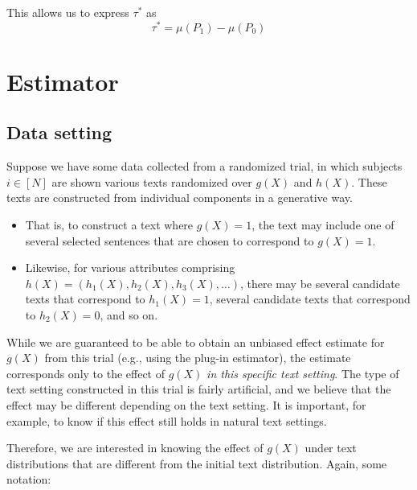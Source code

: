 \documentclass{article}
\begin{document}
This allows us to express $\tau^*$ as
\begin{equation*}
    \boxed{\tau^* = \mu(P_1)-\mu(P_0)}
\end{equation*}

\section{Estimator}

\subsection{Data setting}

Suppose we have some data collected from a randomized trial, in which subjects $i \in [N]$ are shown various texts randomized over $g(X)$ and $h(X)$. These texts are constructed from individual components in a generative way. 
\begin{itemize}
    \item That is, to construct a text where $g(X)=1$, the text may include one of several selected sentences that are chosen to correspond to $g(X)=1$.
    \item Likewise, for various attributes comprising $h(X)=(h_1(X), h_2(X), h_3(X), \dots)$, there may be several candidate texts that correspond to $h_1(X)=1$, several candidate texts that correspond to $h_2(X)=0$, and so on.
\end{itemize}

While we are guaranteed to be able to obtain an unbiased effect estimate for $g(X)$ from this trial (e.g., using the plug-in estimator), the estimate corresponds only to the effect of $g(X)$ \textit{in this specific text setting}. The type of text setting constructed in this trial is fairly artificial, and we believe that the effect may be different depending on the text setting. It is important, for example, to know if this effect still holds in natural text settings.

Therefore, we are interested in knowing the effect of $g(X)$ under text distributions that are different from the initial text distribution. Again, some notation:
\end{document}
